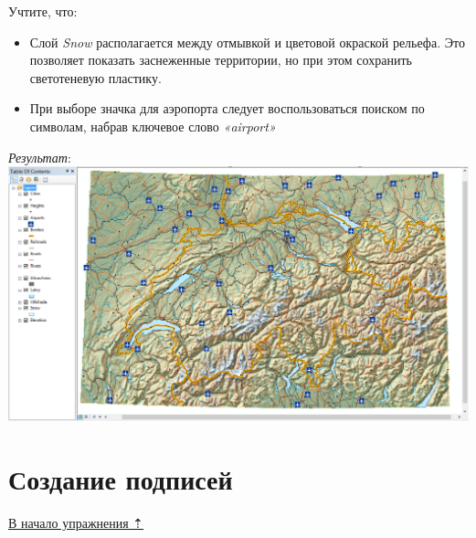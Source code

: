 \documentclass[]{book}
\theoremstyle{definition}
\theoremstyle{definition}
\theoremstyle{definition}
\theoremstyle{remark}
\begin{document}
Учтите, что:

\begin{itemize}
\item
  Слой \emph{Snow} располагается между отмывкой и цветовой окраской
  рельефа. Это позволяет показать заснеженные территории, но при этом
  сохранить светотеневую пластику.
\item
  При выборе значка для аэропорта следует воспользоваться поиском по
  символам, набрав ключевое слово \emph{«airport»}
\end{itemize}

\emph{Результат}: \includegraphics{images/Ex04/image15.png}

\hypertarget{map-design-general-labels}{%
\section{Создание подписей}\label{map-design-general-labels}}

\protect\hyperlink{map-design-general}{В начало упражнения ⇡}
\end{document}
